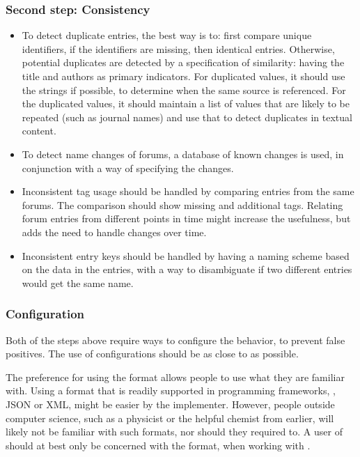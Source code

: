 \subsubsection{Second step: Consistency}
\begin{itemize}
\item To detect duplicate entries, the best way is to: first compare
  unique identifiers, if the identifiers are missing, then identical
  entries.  Otherwise, potential duplicates are detected by a
  specification of similarity: having the title and authors as primary
  indicators.  For duplicated values, it should use the strings if
  possible, to determine when the same source is referenced.  For the
  duplicated values, it should maintain a list of values that are
  likely to be repeated (such as journal names) and use that to detect
  duplicates in textual content.

\item To detect name changes of forums, a database of known changes is
  used, in conjunction with a way of specifying the changes.

\item Inconsistent tag usage should be handled by comparing entries
  from the same forums.  The comparison should show missing and
  additional tags.  Relating forum entries from different points in
  time might increase the usefulness, but adds the need to handle
  changes over time.

\item Inconsistent entry keys should be handled by having a naming
  scheme based on the data in the entries, with a way to disambiguate
  if two different entries would get the same name.
\end{itemize}


\subsubsection{Configuration}
\label{sec:analyzing_configuration}

Both of the steps above require ways to configure the behavior, to
prevent false positives.  The use of configurations should be as close
to {\bibtex} as possible.

The preference for using the {\bibtex} format allows people to use
what they are familiar with.  Using a format that is readily supported
in programming frameworks, \eg, JSON or XML, might be easier by the
implementer.  However, people outside computer science, such as a
physicist or the helpful chemist from earlier, will likely not be
familiar with such formats, nor should they required to.  A user of
{\bibtex} should at best only be concerned with the {\bibtex} format,
when working with {\bibtex}.

